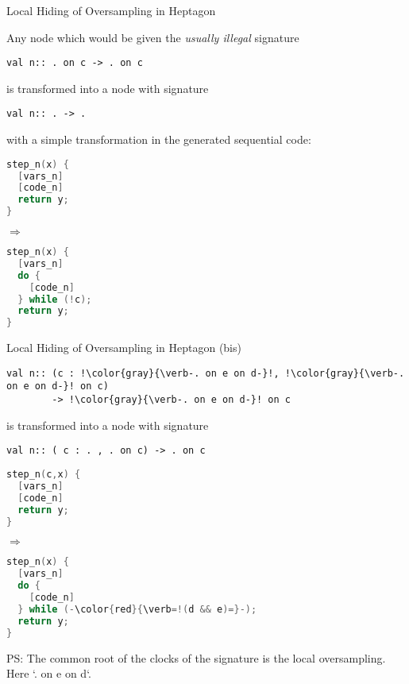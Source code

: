 \documentclass[xcolor=dvipsnames]{beamer}
\begin{document}
\begin{frame}[fragile]{Local Hiding of Oversampling in Heptagon}
\begin{block}{}
Any node which would be given the \emph{usually illegal} signature
\begin{lstlisting}
val n:: . on c -> . on c
\end{lstlisting}
is transformed into a node with signature
\begin{lstlisting}
val n:: . -> .
\end{lstlisting}
with a simple transformation in the generated sequential code:
\end{block}
\begin{block}{}
\begin{minipage}{0.4\linewidth}
\begin{lstlisting}[language=C]
step_n(x) {
  [vars_n]
  [code_n]
  return y;
}
\end{lstlisting}
\end{minipage}$\Longrightarrow$\qquad
\begin{minipage}{0.4\linewidth}
\begin{lstlisting}[language=C]
step_n(x) {
  [vars_n]
  do {
    [code_n]
  } while (!c);
  return y;
}
\end{lstlisting}
\end{minipage}
\end{block}
\end{frame}

\begin{frame}[fragile]{Local Hiding of Oversampling in Heptagon (bis)}
\begin{block}{}
\begin{lstlisting}[escapechar=!]
val n:: (c : !\color{gray}{\verb-. on e on d-}!, !\color{gray}{\verb-. on e on d-}! on c)
        -> !\color{gray}{\verb-. on e on d-}! on c
\end{lstlisting}
is transformed into a node with signature
\begin{lstlisting}
val n:: ( c : . , . on c) -> . on c
\end{lstlisting}
\end{block}
\begin{block}{}
\begin{minipage}{0.4\linewidth}
\begin{lstlisting}[language=C]
step_n(c,x) {
  [vars_n]
  [code_n]
  return y;
}
\end{lstlisting}
\end{minipage}$\Longrightarrow$\qquad
\begin{minipage}{0.4\linewidth}
\begin{lstlisting}[language=C,escapechar=-]
step_n(x) {
  [vars_n]
  do {
    [code_n]
  } while (-\color{red}{\verb=!(d && e)=}-);
  return y;
}
\end{lstlisting}
\end{minipage}
\end{block}
PS: The common root of the clocks of the signature is the local oversampling.
Here `. on e on d`.
\end{frame}
\end{document}
